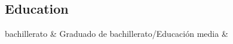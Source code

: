 
\begin{CVbody}

\section{Education}

\begin{CV_table}


bachillerato   &   Graduado de bachillerato/Educación media     &      \\


\end{CV_table}


\end{CVbody}






%






%
%


